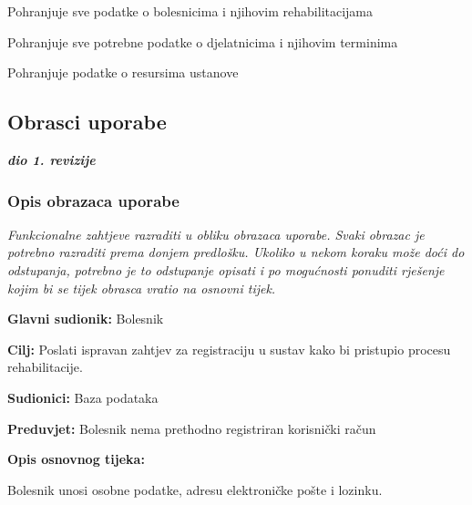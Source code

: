 \documentclass[12pt]{report}
\newenvironment{packed_enum}{
	\begin{enumerate}
		\setlength{\itemsep}{0pt}
		\setlength{\parskip}{0pt}
		\setlength{\parsep}{0pt}
	}{\end{enumerate}}
\begin{document}
\begin{packed_enum}
\begin{packed_enum}
	\end{packed_enum}

	\item {}

	\begin{packed_enum}

		\item Pohranjuje sve podatke o bolesnicima i njihovim rehabilitacijama
		\item Pohranjuje sve potrebne podatke o djelatnicima i njihovim terminima
       		\item Pohranjuje podatke o resursima ustanove 

	\end{packed_enum}
\end{packed_enum}

\eject



\subsection{Obrasci uporabe}

\textbf{\textit{dio 1. revizije}}

\subsubsection{Opis obrazaca uporabe}
\textit{Funkcionalne zahtjeve razraditi u obliku obrazaca uporabe. Svaki obrazac je potrebno razraditi prema donjem predlošku. Ukoliko u nekom koraku može doći do odstupanja, potrebno je to odstupanje opisati i po mogućnosti ponuditi rješenje kojim bi se tijek obrasca vratio na osnovni tijek.}
\vspace{2em} %

	\item \textbf{Glavni sudionik:} Bolesnik
	\item \textbf{Cilj:} Poslati ispravan zahtjev za registraciju u sustav kako bi pristupio procesu rehabilitacije.
	\item \textbf{Sudionici:} Baza podataka
	\item \textbf{Preduvjet:} Bolesnik nema prethodno registriran korisnički račun
	\item \textbf{Opis osnovnog tijeka:}
	\begin{packed_enum}
		\item Bolesnik unosi osobne podatke, adresu elektroničke pošte i lozinku.
	\end{packed_enum}
\closeusecase
\end{document}
